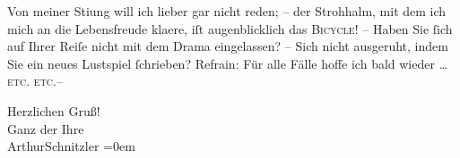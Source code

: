 \pstart
           Von meiner Sti{\geminationm}ung will ich lieber gar nicht reden; –
               der Strohhalm, mit dem ich mich an die Lebensfreude kla{\geminationm}ere, {\pb}iſt augenblicklich das \textsc{Bicycle}! – Haben Sie ſich auf Ihrer Reiſe nicht mit dem Drama eingelassen? –
               Sich nicht ausgeruht, indem Sie ein neues Lustspiel ſchrieben? Refrain: Für alle
               Fälle hoffe ich bald wieder {\dots}{ }\textsc{etc.}{ }\textsc{etc.}–\pend
           
\pstart
           Herzlichen Gruß!{\\[\baselineskip]}Ganz der Ihre{\\[\baselineskip]}\spacefill\mbox{ArthurSchnitzler}\pend
           \leftskip=0em{}\endnumbering{}  \newcommand{\dateiname}{L03904}\newcommand{\titel}{Arthur Schnitzler an Theodor Herzl, 4. 8. 1893}\newcommand{\editorInnen}{Herausgegeben von Jahnke, SelmaMüller, Martin Anton}
